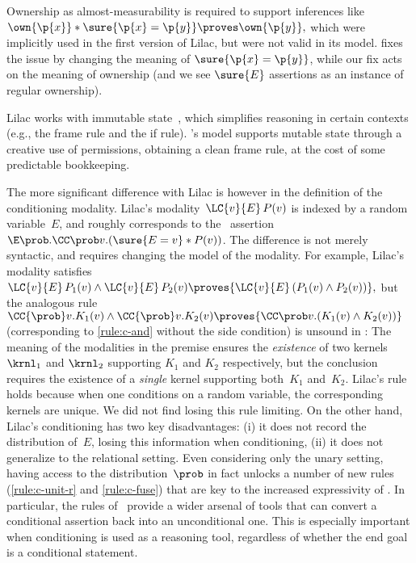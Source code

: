 Ownership as almost-measurability is required to support inferences like
$
  \own{\p{x}} * \sure{\p{x}=\p{y}}
  \proves
  \own{\p{y}},
$
which were implicitly used in the first version of Lilac,
but were not valid in its model.
\citet{lilac2} fixes the issue by changing the meaning of $\sure{\p{x}=\p{y}}$,
while our fix acts on the meaning of ownership
(and we see $\sure{E}$ assertions as an instance of regular ownership).

Lilac works with
immutable state~\cite{staton2020},
which simplifies reasoning in certain contexts
(e.g., the frame rule and the if rule).
\thelogic's model supports mutable state through a creative use of permissions,
obtaining a clean frame rule, at the cost of some predictable bookkeeping.

The more significant difference with Lilac is however in the definition of the conditioning modality.
Lilac's modality~$\LC{v}{E}\,P(v)$ is indexed by a random variable~$E$,
and roughly corresponds to the \thelogic\ assertion
$ \E \prob. \CC \prob v.(\sure{E=v} * P(v)) $.
The difference is not merely syntactic,
and requires changing the model of the modality.
For example, Lilac's modality satisfies
$
  {\LC{v}{E}\,P_1(v) \land \LC{v}{E}\,P_2(v)}
  \proves
  {\LC{v}{E}\,(P_1(v) \land P_2(v))},
$
but the analogous rule
$
  {\CC{\prob} v. K_1(v)
    \land
  \CC{\prob} v. K_2(v)}
  \proves
  {\CC\prob v.
    (K_1(v) \land K_2(v))}
$
(corresponding to \ref{rule:c-and} without the side condition)
is unsound in \thelogic:
The meaning of the modalities in the premise ensures
the \emph{existence} of two kernels $\krnl_1$ and $\krnl_2$ supporting
$K_1$ and $K_2$ respectively,
but the conclusion requires the existence of a \emph{single} kernel
supporting both~$K_1$ and~$K_2$.
Lilac's rule holds because when one conditions on a random variable,
the corresponding kernels are unique.
We did not find losing this rule limiting.
On the other hand,
Lilac's conditioning has two key disadvantages:
(i)  it does not record the distribution of~$E$,
     losing this information when conditioning,
(ii) it does not generalize to the relational setting.
Even considering only the unary setting,
having access to the distribution~$\prob$ in fact unlocks a number of new
rules (\eg \ref{rule:c-unit-r} and \ref{rule:c-fuse})
that are key to the increased expressivity of \thelogic.
In particular, the rules of \thelogic\ provide a wider arsenal of tools
that can convert a conditional assertion back into an unconditional one.
This is especially important when conditioning is used as a reasoning tool,
regardless of whether the end goal is a conditional statement.












